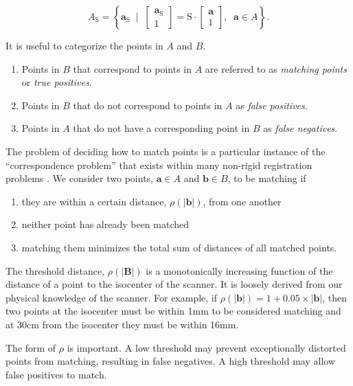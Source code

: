 \documentclass[12pt]{article}
\begin{document}
$$
A_\textrm{S} = \left\{ \mathbf{a}_\textrm{S} \;\; \Big| \;\; \begin{bmatrix} \mathbf{a}_\textrm{S} \\ 1 \end{bmatrix} = \mathrm{S} \cdot \begin{bmatrix} \mathbf{a} \\ 1 \end{bmatrix} , \;\; \mathbf{a} \in A \right\}.
$$

It is useful to categorize the points in $A$ and $B$.

\begin{enumerate}
    \item Points in $B$ that correspond to points in $A$ are referred to as \textit{matching points} or \textit{true positives}.
    \item Points in $B$ that do not correspond to points in $A$ as \textit{false positives}.
    \item Points in $A$ that do not have a corresponding point in $B$ as \textit{false negatives}.
\end{enumerate}

The problem of deciding how to match points is a particular instance of the ``correspondence problem'' that exists within many non-rigid registration problems \cite{hill2001}.  We consider two points, $\textbf{a} \in A$ and $\textbf{b} \in B$, to be matching if

\begin{enumerate}
    \item they are within a certain distance, $\rho(|\textbf{b}|)$, from one another
    \item neither point has already been matched
    \item matching them minimizes the total sum of distances of all matched points.
\end{enumerate}

The threshold distance, $\rho(|\textbf{B}|)$ is a monotonically increasing function of the distance of a point to the isocenter of the scanner.  It is loosely derived from our physical knowledge of the scanner.  For example, if $\rho(|\textbf{b}|) = 1 + 0.05 \times |\textbf{b}|$, then two points at the isocenter must be within 1mm to be considered matching and at 30cm from the isocenter they must be within 16mm.

The form of $\rho$ is important.  A low threshold may prevent exceptionally distorted points from matching, resulting in false negatives.  A high threshold may allow false positives to match.  
\end{document}
